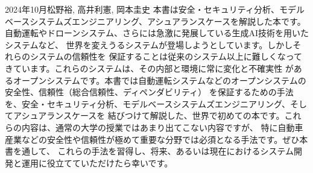 \begin{preface}{2024年10月}{松野裕, 高井利憲, 岡本圭史}
本書は安全・セキュリティ分析、モデルベースシステムズエンジニアリング、アシュアランスケースを解説した本です。
自動運転やドローンシステム、さらには急激に発展している生成AI技術を用いたシステムなど、
世界を変えうるシステムが登場しようとしています。しかしそれらのシステムの信頼性を
保証することは従来のシステム以上に難しくなってきています。これらのシステムは、その内部と環境に常に変化と不確実性
があるオープンシステムです。本書では自動運転システムなどのオープンシステムの安全性、信頼性（総合信頼性、ディペンダビリティ）
を保証するための手法を、安全・セキュリティ分析、モデルベースシステムズエンジニアリング、そしてアシュアランスケースを
結びつけて解説した、世界で初めての本です。これらの内容は、通常の大学の授業ではあまり出てこない内容ですが、
特に自動車産業などの安全性や信頼性が極めて重要な分野では必須となる手法です。ぜひ本書を通して、
これらの手法を習得し、将来、あるいは現在におけるシステム開発と運用に役立てていただけたら幸いです。

\end{preface}
